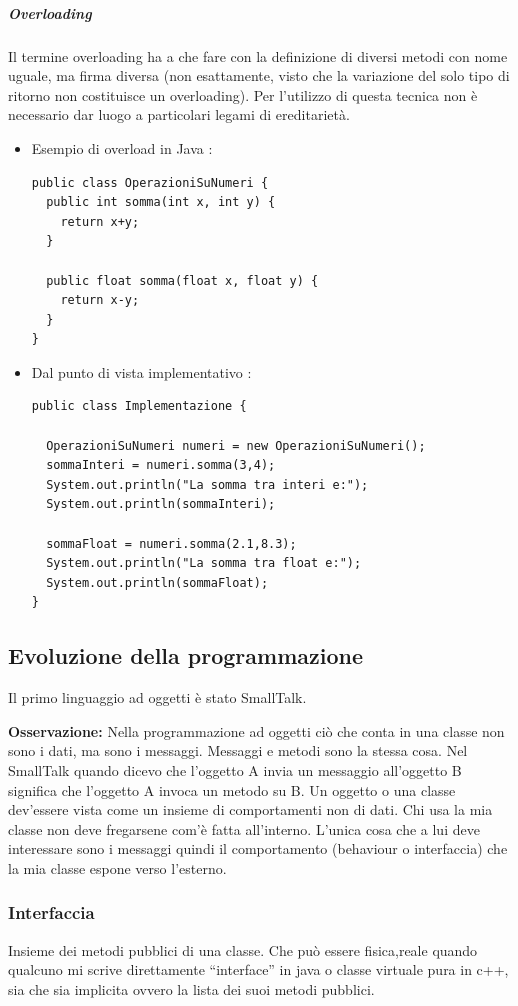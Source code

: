\subparagraph{Overloading}

Il termine overloading ha a che fare con la definizione di diversi metodi con nome uguale, ma firma diversa (non esattamente, visto che la variazione del solo tipo di ritorno non costituisce un overloading). Per l'utilizzo di questa tecnica non è necessario dar luogo a particolari legami di ereditarietà.


    \begin{itemize}
    \item Esempio di overload in Java :
    \begin{lstlisting}
public class OperazioniSuNumeri {
  public int somma(int x, int y) {
    return x+y;
  }

  public float somma(float x, float y) {
    return x-y;
  }
}
\end{lstlisting}
\item Dal punto di vista implementativo :
    \begin{lstlisting}
public class Implementazione {

  OperazioniSuNumeri numeri = new OperazioniSuNumeri();
  sommaInteri = numeri.somma(3,4);
  System.out.println("La somma tra interi e:");
  System.out.println(sommaInteri);

  sommaFloat = numeri.somma(2.1,8.3);
  System.out.println("La somma tra float e:");
  System.out.println(sommaFloat);
}
   \end{lstlisting}
     \end{itemize}

\subsection{Evoluzione della programmazione}

Il primo linguaggio ad oggetti è stato SmallTalk.

\textbf{Osservazione:} Nella programmazione ad oggetti ciò che conta in una classe non sono i dati, ma sono i messaggi. Messaggi e metodi sono la stessa cosa. Nel SmallTalk quando dicevo che l’oggetto A invia un messaggio all’oggetto B significa che l’oggetto A invoca un metodo su B.
Un oggetto o una classe dev’essere vista come un insieme di comportamenti non di dati. Chi usa la mia classe non deve fregarsene com’è fatta all’interno. L’unica cosa che a lui deve interessare sono i messaggi quindi il comportamento (behaviour o interfaccia) che la mia classe espone verso l’esterno.

\subsubsection{Interfaccia}
Insieme dei metodi pubblici di una classe. Che può essere fisica,reale quando qualcuno mi scrive direttamente “interface” in java o classe virtuale pura in c++, sia che sia implicita ovvero la lista dei suoi metodi pubblici.

